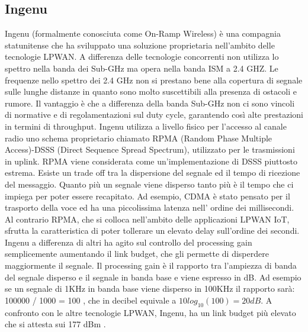 \documentclass[12pt,a4paper,openright,twoside]{report}
\begin{document}
\subsection{Ingenu}
Ingenu (formalmente conosciuta come On-Ramp Wireless) \`e una compagnia statunitense che ha sviluppato una soluzione proprietaria nell'ambito delle tecnologie LPWAN. 
A differenza delle tecnologie concorrenti non utilizza lo spettro nella banda dei Sub-GHz ma opera nella banda ISM a 2.4 GHZ. 
Le frequenze nello spettro dei 2.4 GHz non si prestano bene alla copertura di segnale sulle lunghe distanze in quanto sono molto suscettibili alla presenza di ostacoli e rumore. 
Il vantaggio \`e che a differenza della banda Sub-GHz non ci sono vincoli di normative e di regolamentazioni sul duty cycle, garantendo cos\`i alte prestazioni in termini di throughput. 
Ingenu utilizza a livello fisico per l'accesso al canale radio uno schema proprietario chiamato RPMA (Random Phase Multiple Access)-DSSS (Direct Sequence Spread Spectrum), utilizzato per le trasmissioni in uplink. 
RPMA viene considerata come un'implementazione di DSSS piuttosto estrema. 
Esiste un trade off tra la dispersione del segnale ed il tempo di ricezione del messaggio. Quanto pi\`u un segnale viene disperso tanto pi\`u \`e il tempo che ci impiega per poter essere recapitato. 
Ad esempio, CDMA \`e stato pensato per il trasporto della voce ed ha una piccolissima latenza nell' ordine dei millisecondi. Al contrario RPMA, che si colloca nell'ambito delle applicazioni LPWAN IoT, sfrutta la caratteristica di poter tollerare un elevato delay sull'ordine dei secondi. 
Ingenu a differenza di altri ha agito sul controllo del processing gain semplicemente aumentando il link budget, che gli permette di disperdere maggiormente il segnale. 
Il processing gain \`e il rapporto tra l'ampiezza di banda del segnale disperso e il segnale in banda base e viene espresso in dB. 
Ad esempio se un segnale di 1KHz in banda base viene disperso in 100KHz il rapporto sar\`a: 100000 / 1000 = 100 , che in decibel equivale a $10 log_{10}(100) = 20 dB$. 
A confronto con le altre tecnologie LPWAN, Ingenu, ha un link budget pi\`u elevato che si attesta sui 177 dBm \cite{K6}.
\end{document}
